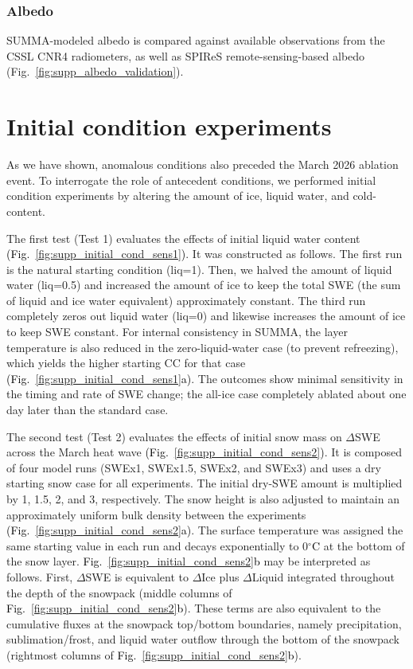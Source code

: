 \documentclass[draft,jgrga]{agutexSI2019}
\newcommand{\fig}[2]{\textcolor{black}{(Fig.~\ref{#1}{#2})}}   %
\newcommand{\fignop}[2]{\textcolor{black}{Fig.~\ref{#1}{#2}}}  %
\newcommand{\degrc}{\textcolor{black}{$^\circ$C}\xspace}
\begin{document}
\begin{article}
\subsubsection{Albedo}\label{supp:sec:albedo}
SUMMA-modeled albedo is compared against available observations from the CSSL CNR4 radiometers, as well as SPIReS remote-sensing-based albedo (Fig.~\ref{fig:supp_albedo_validation}).


\section{Initial condition experiments}\label{supp:init_cond}
As we have shown, anomalous conditions also preceded the March 2026 ablation event.
To interrogate the role of antecedent conditions, we performed initial condition experiments by altering the amount of ice, liquid water, and cold-content.

The first test (Test 1) evaluates the effects of initial liquid water content \fig{fig:supp_initial_cond_sens1}{}.
It was constructed as follows.
The first run is the natural starting condition (liq=1).
Then, we halved the amount of liquid water (liq=0.5) and increased the amount of ice to keep the total SWE (the sum of liquid and ice water equivalent) approximately constant.
The third run completely zeros out liquid water (liq=0) and likewise increases the amount of ice to keep SWE constant.
For internal consistency in SUMMA, the layer temperature is also reduced in the zero-liquid-water case (to prevent refreezing), which yields the higher starting CC for that case \fig{fig:supp_initial_cond_sens1}{a}.
The outcomes show minimal sensitivity in the timing and rate of SWE change; the all-ice case completely ablated about one day later than the standard case.


The second test (Test 2) evaluates the effects of initial snow mass on $\Delta$SWE across the March heat wave \fig{fig:supp_initial_cond_sens2}{}.
It is composed of four model runs (SWEx1, SWEx1.5, SWEx2, and SWEx3) and uses a dry starting snow case for all experiments.
The initial dry-SWE amount is multiplied by 1, 1.5, 2, and 3, respectively.
The snow height is also adjusted to maintain an approximately uniform bulk density between the experiments \fig{fig:supp_initial_cond_sens2}{a}.
The surface temperature was assigned the same starting value in each run and decays exponentially to 0\degrc at the bottom of the snow layer.
\fignop{fig:supp_initial_cond_sens2}{b} may be interpreted as follows.
First, $\Delta$SWE is equivalent to $\Delta$Ice plus $\Delta$Liquid integrated throughout the depth of the snowpack (middle columns of \fignop{fig:supp_initial_cond_sens2}{b}).
These terms are also equivalent to the cumulative fluxes at the snowpack top/bottom boundaries, namely precipitation, sublimation/frost, and liquid water outflow through the bottom of the snowpack (rightmost columns of \fignop{fig:supp_initial_cond_sens2}{b}).


\end{article}
\end{document}
